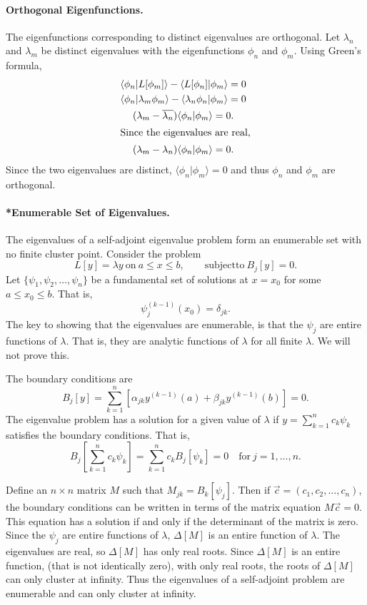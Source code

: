 \paragraph{Orthogonal Eigenfunctions.}
The eigenfunctions corresponding to distinct eigenvalues are orthogonal. 
Let $\lambda_n$ and $\lambda_m$ be distinct eigenvalues with the
eigenfunctions $\phi_n$ and $\phi_m$.  Using Green's formula,
\begin{gather*}
  \langle \phi_n | L[\phi_m] \rangle - \langle L[\phi_n] | \phi_m \rangle = 0 \\
  \langle \phi_n | \lambda_m \phi_m \rangle - \langle \lambda_n \phi_n | \phi_m \rangle=0\\
  (\lambda_m - \overline{\lambda_n})\langle \phi_n | \phi_m \rangle = 0. \\
  \intertext{Since the eigenvalues are real,}
  (\lambda_m - \lambda_n) \langle \phi_n | \phi_m \rangle = 0 .
\end{gather*}
Since the two eigenvalues are distinct, $\langle \phi_n | \phi_m \rangle = 0$
and thus $\phi_n$ and $\phi_m$ are orthogonal.







\paragraph{*Enumerable Set of Eigenvalues.}
The eigenvalues of a self-adjoint eigenvalue problem form an enumerable
set with no finite cluster point.  Consider the problem
\[ L[y] = \lambda y\ \mathrm{on}\ a \leq x \leq b, 
\qquad \mathrm{subject to}\ B_j[y] = 0. \]
Let $\{ \psi_1, \psi_2, \ldots, \psi_n \}$ be a fundamental set of solutions
at $x = x_0$ for some $a \leq x_0 \leq b$.  That is,
\[ \psi_j^{(k-1)}(x_0) = \delta_{j k}.\]
The key to showing that the eigenvalues are enumerable, is that the
$\psi_j$ are entire functions of $\lambda$. That is, they are 
analytic functions of $\lambda$ for all finite $\lambda$.  We will 
not prove this.

The boundary conditions are
\[ B_j[y] = \sum_{k=1}^n \left[ \alpha_{j k} y^{(k-1)}(a) 
  + \beta_{j k}y^{(k-1)}(b)\right] = 0.\]
The eigenvalue problem has a solution for a given value of $\lambda$ if
$y = \sum_{k=1}^n c_k \psi_k$ satisfies the boundary conditions.  That is,
\[ B_j \left[ \sum_{k=1}^n c_k \psi_k \right] 
= \sum_{k=1}^n c_k B_j[\psi_k] = 0
\quad \mathrm{for}\ j = 1, \ldots, n.\]

Define an $n \times n$ matrix $M$ such that $M_{j k} = B_k[\psi_j]$. 
Then if $\vec{c} = (c_1, c_2, \ldots, c_n)$, the boundary conditions can 
be written in terms of the matrix equation $M \vec{c} = 0$.  This equation
has a solution if and only if the determinant of the matrix is zero.
Since the $\psi_j$ are entire functions of $\lambda$,
$\Delta[M]$ is an entire function of $\lambda$.  The eigenvalues are real,
so $\Delta[M]$ has only real roots.  Since $\Delta[M]$ is an entire
function, (that is not identically zero), with only real roots, the roots
of $\Delta[M]$ can only cluster at infinity.  Thus the eigenvalues of
a self-adjoint problem are enumerable and can only cluster at infinity.

